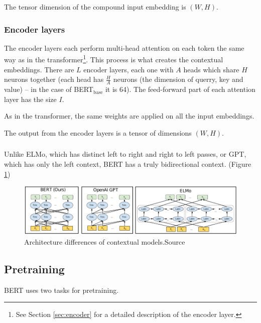 \documentclass[
  printed, %
  color,   %
  table,   %
  oneside, %
  lof,     %
  lot,     %
]{fithesis3}
\begin{document}
The tensor dimension of the compound input embedding is $(W, H)$.

\subsubsection{Encoder layers}
The encoder layers each perform multi-head attention on each token the same way as in the transformer\footnote{See Section \ref{sec:encoder} for a detailed description of the encoder layer.}. This process is what creates the contextual embeddings. There are $L$ encoder layers, each one with $A$ heads which share $H$ neurons together (each head has $\frac{H}{A}$ neurons (the dimension of querry, key and value) -- in the case of BERT$_\text{base}$ it is 64). The feed-forward part of each attention layer has the size $I$. 

As in the transformer, the same weights are applied on all the input embeddings.

The output from the encoder layers is a tensor of dimensions  $(W, H)$.

\subsubsection{}

Unlike ELMo, which has distinct left to right and right to left passes, or GPT\parencite{gpt}, which has only the left context, BERT has a truly bidirectional context. (Figure \ref{fig:contextual_models})

\begin{figure}[h]
  \begin{center}
    \includegraphics[width=\linewidth]{img/contextual_models.pdf}
  \end{center}
  \vspace{-0.5cm}
  \caption[Architecture differences of contextual models]{\centering Architecture differences of contextual models.\newline{}Source \parencite[page 13]{bert}}
  \label{fig:contextual_models}
\end{figure}



\subsection{Pretraining}
\label{sec:bert_pretraining}
BERT uses two tasks for pretraining.
\end{document}
